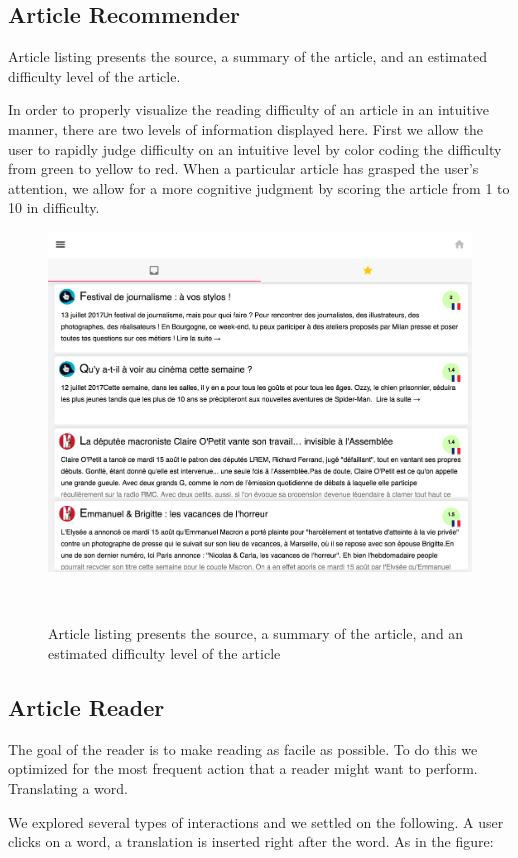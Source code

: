 \newpage
\subsection{Article Recommender}

Article listing presents the source, a summary of the article, and an estimated difficulty level of the article.

In order to properly visualize the reading difficulty of an article in an intuitive manner, there are two levels of information displayed here. First we allow the user to rapidly judge difficulty on an intuitive level by color coding the difficulty from green to yellow to red. When a particular article has grasped the user’s attention, we allow for a more cognitive judgment by scoring the article from 1 to 10 in difficulty.

\begin{figure}[h!]
\centering
  \includegraphics[width=0.7\columnwidth]{figures/article_listing}
  \caption{Article listing presents the source, a summary of the article, and an estimated difficulty level of the article }~\label{fig:registrations}
\end{figure}


\subsection{Article Reader}

The goal of the reader is to make reading as facile as possible. To do this we optimized for the most frequent action that a reader might want to perform. Translating a word. 

We explored several types of interactions and we settled on the following. 
A user clicks on a word, a translation is inserted right after the word. As in the figure: 

